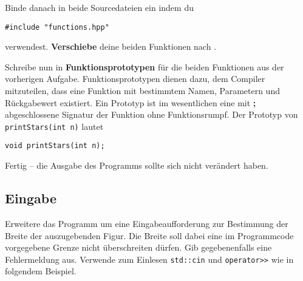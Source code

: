 Binde danach  in beide Sourcedateien ein indem du

\begin{lstlisting}
#include "functions.hpp"
\end{lstlisting}

verwendest.
\textbf{Verschiebe} deine beiden Funktionen nach .

Schreibe nun in  \textbf{Funktionsprototypen} für die beiden Funktionen aus der vorherigen Aufgabe.
Funktionsprototypen dienen dazu, dem Compiler mitzuteilen, dass eine Funktion mit bestimmtem Namen, Parametern und Rückgabewert existiert.
Ein Prototyp ist im wesentlichen eine mit \textbf{;} abgeschlossene Signatur der Funktion ohne Funktionsrumpf.
Der Prototyp von \lstinline{printStars(int n)} lautet 
\begin{lstlisting}
void printStars(int n);
\end{lstlisting}

Fertig -- die Ausgabe des Programms sollte sich nicht verändert haben.


\subsection{Eingabe}
Erweitere das Programm um eine Eingabeaufforderung zur Bestimmung der Breite der auszugebenden Figur.
Die Breite soll dabei eine im Programmcode vorgegebene Grenze nicht überschreiten dürfen.
Gib gegebenenfalls eine Fehlermeldung aus.
Verwende zum Einlesen \lstinline{std::cin} und \lstinline{operator>>} wie in folgendem Beispiel.


